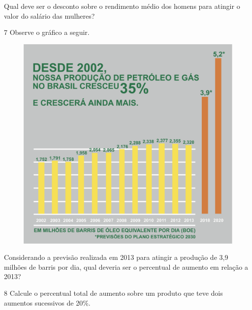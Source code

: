 Qual deve ser o desconto sobre o rendimento médio dos homens para
atingir o valor do salário das mulheres?

\begin{emptybox}
\vspace{2cm}
\end{emptybox}

\pagebreak
\num{7} Observe o gráfico a seguir. 

\begin{figure}[htpb!]
\centering
\includegraphics[width=.8\textwidth]{./ilustras-mat/modulo_4-atividade_7.png}
\end{figure}


Considerando a previsão realizada em 2013 para atingir a produção de 3,9
milhões de barris por dia, qual deveria ser o percentual de aumento em
relação a 2013?

\begin{emptybox}
\end{emptybox}

\num{8} Calcule o percentual total de aumento sobre um produto que teve
dois aumentos sucessivos de 20\%.

